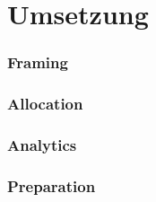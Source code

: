 \newpage
\section{Umsetzung} \label{Umsetzung}

\subsubsection{Framing}


\subsubsection{Allocation}


\subsubsection{Analytics}


\subsubsection{Preparation}
